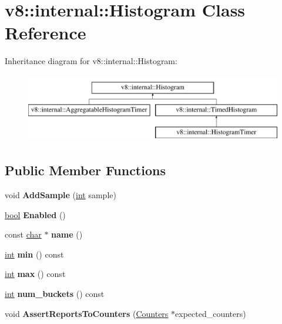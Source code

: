 \hypertarget{classv8_1_1internal_1_1Histogram}{}\section{v8\+:\+:internal\+:\+:Histogram Class Reference}
\label{classv8_1_1internal_1_1Histogram}
Inheritance diagram for v8\+:\+:internal\+:\+:Histogram\+:\begin{figure}[H]
\begin{center}
\leavevmode
\includegraphics[height=3.000000cm]{classv8_1_1internal_1_1Histogram}
\end{center}
\end{figure}
\subsection*{Public Member Functions}
\begin{DoxyCompactItemize}
\item 
\mbox{\label{classv8_1_1internal_1_1Histogram_a1fa018dc2756acdc3a1bb4fdbe97ae86}} 
void {\bfseries Add\+Sample} (\mbox{\hyperlink{classint}{int}} sample)
\item 
\mbox{\label{classv8_1_1internal_1_1Histogram_a8c6f22e6b5446dfc455a8af4e97eb21b}} 
\mbox{\hyperlink{classbool}{bool}} {\bfseries Enabled} ()
\item 
\mbox{\label{classv8_1_1internal_1_1Histogram_a22b3415f2c6489eb208ae2f742061e6c}} 
const \mbox{\hyperlink{classchar}{char}} $\ast$ {\bfseries name} ()
\item 
\mbox{\label{classv8_1_1internal_1_1Histogram_a485f1bade62dcd9cfde6a5c1d46d8b3a}} 
\mbox{\hyperlink{classint}{int}} {\bfseries min} () const
\item 
\mbox{\label{classv8_1_1internal_1_1Histogram_ab252f51fbc2b14ea063581dcca2ae843}} 
\mbox{\hyperlink{classint}{int}} {\bfseries max} () const
\item 
\mbox{\label{classv8_1_1internal_1_1Histogram_aee94d7c6c079e1a08270203b5cf1caf5}} 
\mbox{\hyperlink{classint}{int}} {\bfseries num\+\_\+buckets} () const
\item 
\mbox{\label{classv8_1_1internal_1_1Histogram_ae429483e2d91a0b3d6e1c9284caf7d8a}} 
void {\bfseries Assert\+Reports\+To\+Counters} (\mbox{\hyperlink{classv8_1_1internal_1_1Counters}{Counters}} $\ast$expected\+\_\+counters)
\end{DoxyCompactItemize}
